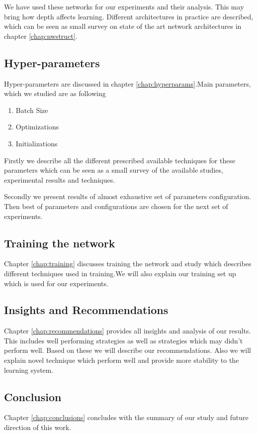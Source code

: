 We have used these networks for our experiments and their analysis. This may bring how depth affects learning. Different architectures in practice are described, which can be seen as small survey on state of the art network architectures in chapter \ref{chap:nwstruct}.

\subsection{Hyper-parameters}
Hyper-parameters are discussed in chapter \ref{chap:hyperparams}.Main parameters, which we studied are as following
\begin{enumerate}
	\item Batch Size
	\item Optimizations
	\item Initializations
\end{enumerate} 

Firstly we describe all the different prescribed available techniques for these parameters which can be seen as a small survey of the available studies, experimental results and techniques.

Secondly we present results of almost exhaustive set of parameters configuration. Then best of parameters and configurations are chosen for the next set of experiments.

\subsection{Training the network}

Chapter \ref{chap:training} discusses training the network and study which describes different techniques used in training.We will also explain our training set up which is used for our experiments.


\subsection{Insights and Recommendations}
Chapter \ref{chap:recommendations} provides all insights and analysis of our results. This includes well performing strategies as well as strategies which may didn't  perform well.
Based on these we will describe our recommendations. Also we will explain novel technique which perform well and provide more stability to the learning system.

\subsection{Conclusion}
Chapter \ref{chap:conclusions} concludes with the summary of our study and future direction of this work.

